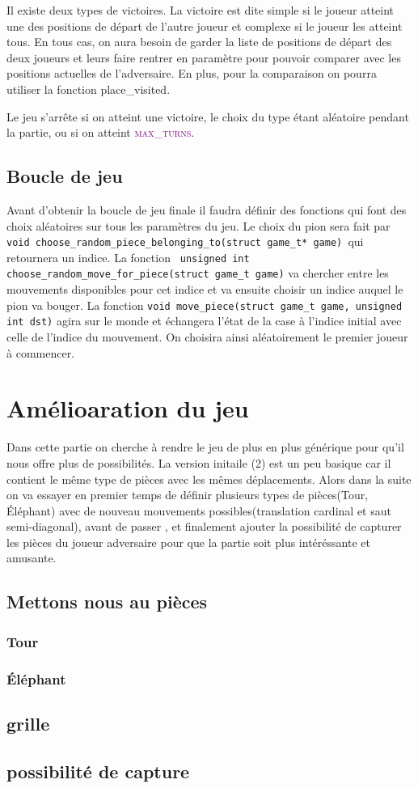 \documentclass[a4paper]{article}
\begin{document}
Il existe deux types de victoires. La victoire est dite simple si le joueur atteint une des positions de départ de l’autre joueur et complexe si le joueur les atteint tous. En tous cas, on aura besoin de garder la liste de positions de départ des deux joueurs et leurs faire rentrer en paramètre pour pouvoir comparer avec les positions actuelles de l’adversaire. En plus, pour la comparaison on pourra utiliser la fonction place\_visited. 

Le jeu s’arrête si on atteint une victoire, le choix du type étant aléatoire pendant la partie, ou si on atteint \textcolor{purple}{\textsc{max\_turns}}. 
\subsection{Boucle de jeu}
Avant d’obtenir la boucle de jeu finale il faudra définir des fonctions qui font des choix aléatoires sur tous les paramètres du jeu. 
Le choix du pion sera fait par \lstinline|void choose_random_piece_belonging_to(struct game_t* game) |qui retournera un indice. La fonction \lstinline| unsigned int choose_random_move_for_piece(struct game_t game)| va chercher entre les mouvements disponibles pour cet indice et va ensuite choisir un indice auquel le pion va bouger. La fonction \lstinline|void move_piece(struct game_t game, unsigned int dst)| agira sur le monde et échangera l’état de la case à l’indice initial avec celle de l’indice du mouvement. On choisira ainsi aléatoirement le premier joueur à commencer. 



\section{Amélioaration du jeu}

Dans cette partie on cherche à rendre le jeu de plus en plus générique pour qu'il nous offre plus de possibilités. La version initaile (2) est un peu basique car il contient le même type de pièces avec les mêmes déplacements.
Alors dans la suite on va essayer en premier temps de définir plusieurs types de pièces(Tour, Éléphant) avec de nouveau mouvements possibles(translation cardinal et saut semi-diagonal), avant de passer , et finalement ajouter la possibilité de capturer les pièces du joueur adversaire pour que la partie soit plus intéréssante et amusante.
\subsection{Mettons nous au pièces}
\subsubsection{Tour}


\subsubsection{Éléphant}


\subsection{grille}


\subsection{possibilité de capture}
\subsubsection{}
\end{document}
